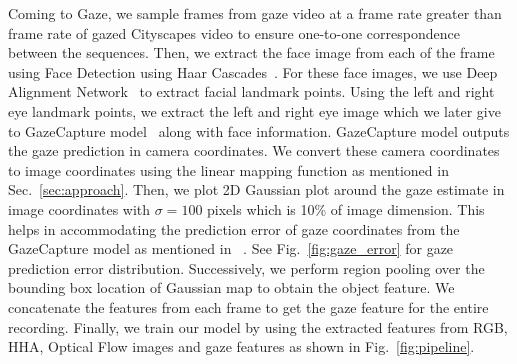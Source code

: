 \documentclass[10pt,twocolumn,letterpaper]{article}
\begin{document}
Coming to Gaze, we sample frames from gaze video at a frame rate greater than frame rate of gazed Cityscapes video to ensure one-to-one correspondence between the sequences. Then, we extract the face image from each of the frame using Face Detection using Haar Cascades~\cite{viola2001rapid}. For these face images, we use Deep Alignment Network~\cite{kowalski2017deep} to extract facial landmark points. Using the left and right eye landmark points, we extract the left and right eye image which we later give to GazeCapture model~\cite{krafka2016eye} along with face information. GazeCapture model outputs the gaze prediction in camera coordinates. We convert these camera coordinates to image coordinates using the linear mapping function as mentioned in Sec.~\ref{sec:approach}. 
Then, we plot 2D Gaussian plot around the gaze estimate in image coordinates with $\sigma=100$ pixels which is 10\% of image dimension. This helps in accommodating the prediction error of gaze coordinates from the GazeCapture model as mentioned in ~\cite{krafka2016eye}. See Fig.~\ref{fig:gaze_error} for gaze prediction error distribution. Successively, we perform region pooling over the bounding box location of Gaussian map to obtain the object feature. We concatenate the features from each frame to get the gaze feature for the entire recording. Finally, we train our model by using the extracted features from RGB, HHA, Optical Flow images and gaze features as shown in Fig.~\ref{fig:pipeline}.
\end{document}
